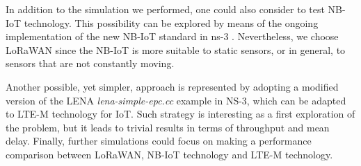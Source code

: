 \documentclass[10pt, a4paper, twocolumn]{article}
\theoremstyle{definition}
\begin{document}
In addition to the simulation we performed, one could also consider to test NB-IoT technology. This possibility can be explored by means of the ongoing implementation of the new NB-IoT standard in ns-3 \cite{NB_IoT}. Nevertheless, we choose LoRaWAN since the NB-IoT is more suitable to static sensors, or in general, to sensors that are not constantly moving.


Another possible, yet simpler, approach is represented by adopting a modified version of the LENA \textit{lena-simple-epc.cc} example \cite{LENA} in NS-3, which can be adapted \cite{modify_LTE} to LTE-M technology for IoT. Such strategy is interesting as a first exploration of the problem, but it leads to trivial results in terms of throughput and mean delay.
Finally, further simulations could focus on making a performance comparison between LoRaWAN, NB-IoT technology and LTE-M technology.

\end{document}

